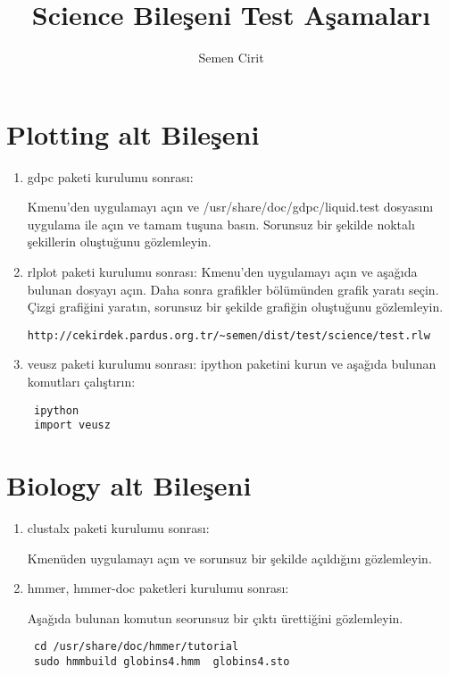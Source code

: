 \documentclass[a4paper,10pt]{article}
\title{Science Bileşeni Test Aşamaları}
\author{Semen Cirit}
\begin{document}
\maketitle


\section{Plotting alt Bileşeni}
\begin{enumerate}
 \item gdpc paketi kurulumu sonrası:

Kmenu'den uygulamayı açın ve /usr/share/doc/gdpc/liquid.test dosyasını uygulama ile açın ve tamam tuşuna basın. Sorunsuz bir şekilde noktalı şekillerin oluştuğunu gözlemleyin.

\item rlplot paketi kurulumu sonrası:
Kmenu'den uygulamayı açın ve aşağıda bulunan dosyayı açın. Daha sonra grafikler bölümünden grafik yaratı seçin. Çizgi grafiğini yaratın, sorunsuz bir şekilde grafiğin oluştuğunu gözlemleyin.

\begin{verbatim}
http://cekirdek.pardus.org.tr/~semen/dist/test/science/test.rlw 
\end{verbatim}
\item veusz paketi kurulumu sonrası:
ipython paketini kurun ve aşağıda bulunan komutları çalıştırın:
\begin{verbatim}
 ipython
 import veusz
\end{verbatim}
\end{enumerate}



\section{Biology alt Bileşeni}
\begin{enumerate}
 \item clustalx paketi kurulumu sonrası:

Kmenüden uygulamayı açın ve sorunsuz bir şekilde açıldığını gözlemleyin.

\item hmmer, hmmer-doc paketleri kurulumu sonrası:

Aşağıda bulunan komutun seorunsuz bir çıktı ürettiğini gözlemleyin.
\begin{verbatim}
 cd /usr/share/doc/hmmer/tutorial
 sudo hmmbuild globins4.hmm  globins4.sto
\end{verbatim}

\end{enumerate}
\end{document}
